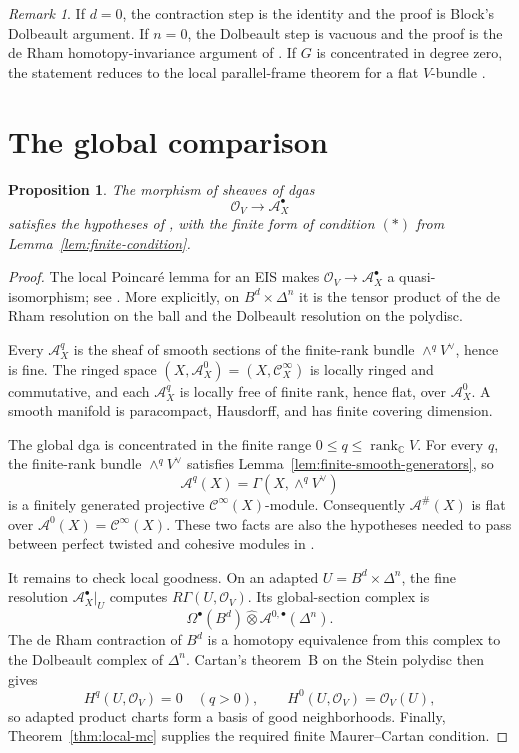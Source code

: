 \documentclass[12pt]{amsart}
\newtheorem{prop}[thm]{Proposition}
\theoremstyle{definition}
\theoremstyle{remark}
\newtheorem{rem}[thm]{Remark}
\numberwithin{equation}{section}
\newcommand{\CA}{\mathcal A}
\newcommand{\CO}{\mathcal O}
\newcommand{\C}{\mathbb C}
\newcommand{\cinf}{\mathcal C^\infty}
\begin{document}
\begin{rem}\label{rem:boundary-cases}
If \(d=0\), the contraction step is the identity and the proof is Block's
Dolbeault argument.  If \(n=0\), the Dolbeault step is vacuous and the proof
is the de Rham homotopy-invariance argument of
\cite[Theorem~8.1]{CHL2021}.  If \(G\) is concentrated in degree zero, the
statement reduces to the local parallel-frame theorem for a flat
\(V\)-bundle \cite[Theorem~7]{Korman2014}.
\end{rem}

\section{The global comparison}

\begin{prop}\label{prop:chl-hypotheses}
The morphism of sheaves of dgas
\[
\CO_V\longrightarrow\CA_X^\bullet
\]
satisfies the hypotheses of
\cite[Corollary~3.4, Proposition~7.4 and Theorem~7.10]{CHL2021}, with the
finite form of condition \({(*)}\) from
Lemma~\ref{lem:finite-condition}.
\end{prop}

\begin{proof}
The local Poincar\'e lemma for an EIS makes
\(\CO_V\to\CA_X^\bullet\) a quasi-isomorphism; see
\cite[Theorem~6]{Korman2014}.  More explicitly, on
\(B^d\times\Delta^n\) it is the tensor product of the de Rham resolution on
the ball and the Dolbeault resolution on the polydisc.

Every \(\CA_X^q\) is the sheaf of smooth sections of the finite-rank bundle
\(\wedge^qV^\vee\), hence is fine.  The ringed space
\((X,\CA_X^0)=(X,\cinf_X)\) is locally ringed and commutative, and each
\(\CA_X^q\) is locally free of finite rank, hence flat, over \(\CA_X^0\).
A smooth manifold is paracompact, Hausdorff, and has finite covering
dimension.

The global dga is concentrated in the finite range
\(0\leq q\leq\operatorname{rank}_{\C}V\).  For every \(q\), the finite-rank
bundle \(\wedge^qV^\vee\) satisfies
Lemma~\ref{lem:finite-smooth-generators}, so
\[
\CA^q(X)=\Gamma(X,\wedge^qV^\vee)
\]
is a finitely generated projective \(\cinf(X)\)-module.  Consequently
\(\CA^\#(X)\) is flat over \(\CA^0(X)=\cinf(X)\).  These two facts are also
the hypotheses needed to pass between perfect twisted and cohesive modules
in \cite[Corollary~3.4]{CHL2021}.

It remains to check local goodness.  On an adapted
\(U=B^d\times\Delta^n\), the fine resolution \(\CA_X^\bullet|_U\) computes
\(R\Gamma(U,\CO_V)\).  Its global-section complex is
\[
\Omega^\bullet(B^d)\widehat\otimes\CA^{0,\bullet}(\Delta^n).
\]
The de Rham contraction of \(B^d\) is a homotopy equivalence from this
complex to the Dolbeault complex of \(\Delta^n\).  Cartan's theorem~B on the
Stein polydisc then gives
\[
H^q(U,\CO_V)=0\quad(q>0),
\qquad
H^0(U,\CO_V)=\CO_V(U),
\]
so adapted product charts form a basis of good neighborhoods.  Finally,
Theorem~\ref{thm:local-mc} supplies the required finite Maurer--Cartan
condition.
\end{proof}
\end{document}
